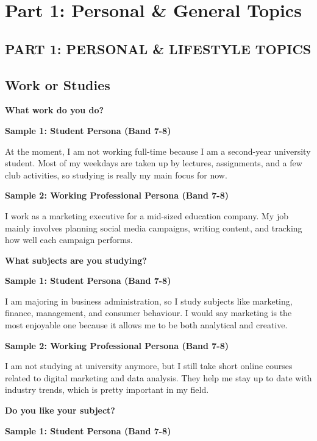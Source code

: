 \chapter{Part 1: Personal \& General Topics}

\section*{PART 1: PERSONAL \& LIFESTYLE TOPICS}

\section{Work or Studies}
\begin{ieltsquestion}
\textbf{What work do you do?}
\end{ieltsquestion}
\textbf{Sample 1: Student Persona (Band 7-8)}

At the moment, I am not working full-time because I am a second-year university student. Most of my weekdays are taken up by lectures, assignments, and a few club activities, so studying is really my main focus for now.

\textbf{Sample 2: Working Professional Persona (Band 7-8)}

I work as a marketing executive for a mid-sized education company. My job mainly involves planning social media campaigns, writing content, and tracking how well each campaign performs.

\separator

\begin{ieltsquestion}
\textbf{What subjects are you studying?}
\end{ieltsquestion}
\textbf{Sample 1: Student Persona (Band 7-8)}

I am majoring in business administration, so I study subjects like marketing, finance, management, and consumer behaviour. I would say marketing is the most enjoyable one because it allows me to be both analytical and creative.

\textbf{Sample 2: Working Professional Persona (Band 7-8)}

I am not studying at university anymore, but I still take short online courses related to digital marketing and data analysis. They help me stay up to date with industry trends, which is pretty important in my field.

\separator

\begin{ieltsquestion}
\textbf{Do you like your subject?}
\end{ieltsquestion}
\textbf{Sample 1: Student Persona (Band 7-8)}

